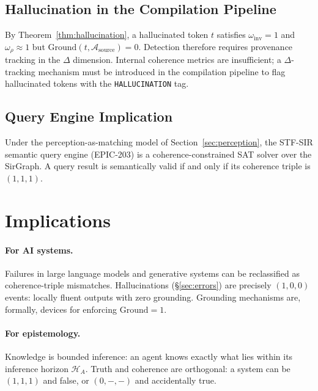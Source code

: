\documentclass{article}
\newcommand{\STF}{{\normalfont\textsc{STF}}}
\newcommand{\SIR}{{\normalfont\textsc{SIR}}}
\newcommand{\Horizon}{\mathcal{H}}
\begin{document}
\subsection{Hallucination in the Compilation Pipeline}

By Theorem~\ref{thm:hallucination}, a hallucinated token $t$ satisfies
$\omega_{\mathrm{inv}} = 1$ and $\omega_\rho \approx 1$ but
$\mathrm{Ground}(t, \mathcal{A}_{\mathrm{source}}) = 0$.  Detection therefore
requires provenance tracking in the $\Delta$ dimension.  Internal coherence
metrics are insufficient; a $\Delta$-tracking mechanism must be introduced in
the compilation pipeline to flag hallucinated tokens with the
\texttt{HALLUCINATION} tag.

\subsection{Query Engine Implication}

Under the perception-as-matching model of Section~\ref{sec:perception}, the
\STF{}-\SIR{} semantic query engine (EPIC-203) is a coherence-constrained SAT
solver over the SirGraph.  A query result is semantically valid if and only if
its coherence triple is $(1,1,1)$.

\section{Implications}
\label{sec:implications}

\paragraph{For AI systems.}
Failures in large language models and generative systems can be reclassified as
coherence-triple mismatches.  Hallucinations (\S\ref{sec:errors}) are precisely
$(1,0,0)$ events: locally fluent outputs with zero grounding.  Grounding
mechanisms are, formally, devices for enforcing $\mathrm{Ground} = 1$.

\paragraph{For epistemology.}
Knowledge is bounded inference: an agent knows exactly what lies within its
inference horizon $\Horizon_A$.  Truth and coherence are orthogonal: a system
can be $(1,1,1)$ and false, or $(0,-,-)$ and accidentally true.
\end{document}
